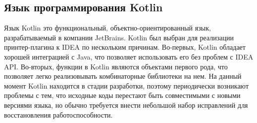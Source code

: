 \subsection{Язык программирования Kotlin}

Язык Kotlin это функциональный, объектно-ориентированный язык,
разрабатываемый в компании JetBrains.
Kotlin был выбран для реализации принтер-плагина к IDEA по нескольким причинам. 
Во-первых, Kotlin обладает хорошей интеграцией с Java, что позволяет
использовать его без проблем с IDEA API. 
Во-вторых, функции в Kotlin являются объектами первого рода, что позволяет
легко реализовывать комбинаторные библиотеки на нем.
На данный момент Kotlin находится в стадии разработки, поэтому
периодически возникают
проблемы с тем, что исходные коды перестают быть совместимыми с новыми
версиями языка,
но обычно требуется внести небольшой набор исправлений для
восстановления работоспособности.
